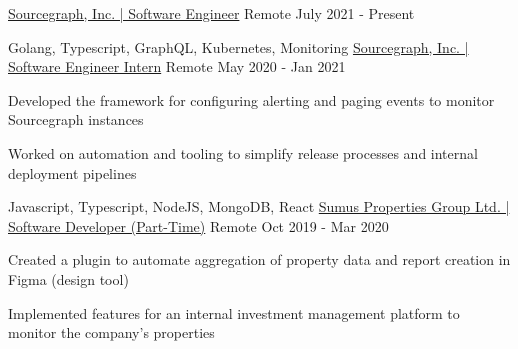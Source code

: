 

\begin{cventries}

  \cventry
    {} %
    {\href{https://bobheadxi.dev/experience/sourcegraph}{Sourcegraph, Inc. | Software Engineer}} %
    {Remote} %
    {July 2021 - Present} %
    {}

  \cventry
    {Golang, Typescript, GraphQL, Kubernetes, Monitoring} %
    {\href{https://bobheadxi.dev/experience/sourcegraph-intern}{Sourcegraph, Inc. | Software Engineer Intern}} %
    {Remote} %
    {May 2020 - Jan 2021} %
    {
      \begin{cvitems} %
        \item {Developed the framework for configuring alerting and paging events to monitor Sourcegraph instances}
        \item {Worked on automation and tooling to simplify release processes and internal deployment pipelines}
      \end{cvitems}
    }

  \cventry
    {Javascript, Typescript, NodeJS, MongoDB, React} %
    {\href{https://bobheadxi.dev/experience/sumus}{Sumus Properties Group Ltd. | Software Developer (Part-Time)}} %
    {Remote} %
    {Oct 2019 - Mar 2020} %
    {
      \begin{cvitems} %
        \item {Created a plugin to automate aggregation of property data and report creation in Figma (design tool)}
        \item {Implemented features for an internal investment management platform to monitor the company's properties}
      \end{cvitems}
    }



\end{cventries}
